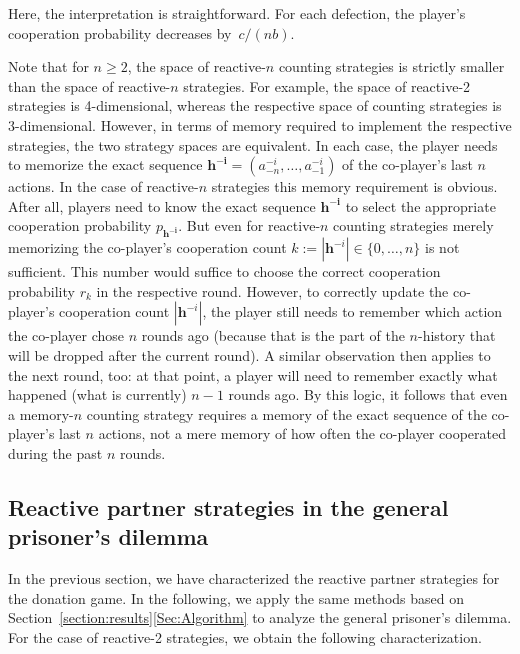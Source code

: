 \documentclass[9pt,twoside,lineno]{pnas-new}
\theoremstyle{plainCl1}
\theoremstyle{plainCl2}
\begin{document}
\noindent
Here, the interpretation is straightforward.
For each defection, the player's cooperation probability decreases by~$c/(nb)$. 

Note that for $n\!\ge\!2$, the space of reactive-$n$ counting strategies is strictly smaller than the space of reactive-$n$ strategies. 
For example, the space of reactive-2 strategies is 4-dimensional, whereas the respective space of counting strategies is 3-dimensional. 
However, in terms of memory required to implement the respective strategies, the two strategy spaces are equivalent. 
In each case, the player needs to memorize the exact sequence $\mathbf{h^{-i}}\!=\!(a^{-i}_{-n},\ldots, a^{-i}_{-1})$ of the co-player's last $n$ actions. 
In the case of reactive-$n$ strategies this memory requirement is obvious. 
After all, players need to know the exact sequence $\mathbf{h^{-i}}$ to select the appropriate cooperation probability $p_{\mathbf{h^{-i}}}$. 
But even for reactive-$n$ counting strategies merely memorizing the co-player's cooperation count $k:=|\mathbf{h}^{-i}| \in \{0,\ldots,n\}$  is not sufficient. 
This number would suffice to choose the correct cooperation probability $r_k$ in the respective round. 
However, to correctly update the co-player's cooperation count $|\mathbf{h}^{-i}|$, the player still needs to remember which action the co-player chose $n$ rounds ago (because that is the part of the $n$-history that will be dropped after the current round). 
A similar observation then applies to the next round, too: at that point, a player will need to remember exactly what happened (what is currently) $n\!-\!1$ rounds ago. 
By this logic, it follows that even a memory-$n$ counting strategy requires a memory of the exact sequence of the co-player's last $n$ actions, not a mere memory of how often the co-player cooperated during the past $n$ rounds. 


\subsection{Reactive partner strategies in the general prisoner's dilemma}\label{section:general_prisoners_dilemma}

In the previous section, we have characterized the reactive partner strategies for the donation game. 
In the following, we apply the same methods based on Section~\ref{section:results}\ref{Sec:Algorithm} to analyze the general prisoner's dilemma. 
For  the case of reactive-2 strategies, we obtain the following characterization. 
\end{document}
